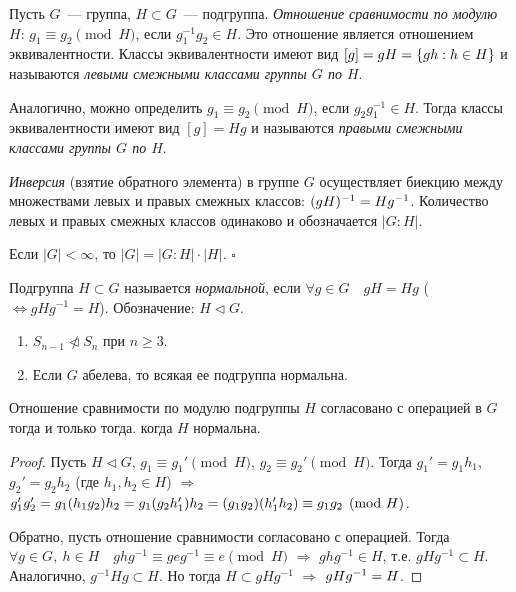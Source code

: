 \documentclass[a4paper]{article}
\newcommand*{\p}[1]{#1\nobreak\discretionary{}{\hbox{$\mathsurround=0pt #1$}}{}}
\begin{document}
Пусть $G$~--- группа, $H\subset G$~--- подгруппа. \emph{Отношение
сравнимости по модулю $H$}: $g_1\equiv g_2\pmod{H}$, если
$g_1^{-1}g_2\in H$. Это отношение является отношением
эквивалентности. Классы эквивалентности имеют вид $[g]\p=gH=\{gh:
h\in H\}$ и называются \emph{левыми смежными классами группы $G$ по
$H$}.

Аналогично, можно определить $g_1\equiv g_2\pmod{H}$, если
$g_2g_1^{-1}\in H$. Тогда классы эквивалентности имеют вид $[g]=Hg$
и называются \emph{правыми смежными классами группы $G$ по $H$}.

\emph{Инверсия} (взятие обратного элемента) в группе $G$
осуществляет биекцию между множествами левых и правых смежных
классов: $(gH)^{-1}\p=Hg^{-1}$. Количество левых и правых смежных
классов одинаково и обозначается $|G:H|$.

\begin{theorem}[Лагранж]
Если $|G|<\infty$, то $|G|=|G:H|\cdot |H|$. $\square$
\end{theorem}

Подгруппа $H\subset G$ называется \emph{нормальной}, если $\forall
g\in G\quad gH=Hg$ ($\Leftrightarrow gHg^{-1}=H$). Обозначение:
$H\triangleleft G$.

\prim
\begin{enumerate}
  \item $S_{n-1}\ntriangleleft S_n$ при $n\geqslant 3$.
  \item Если $G$ абелева, то всякая ее подгруппа нормальна.
\end{enumerate}

\begin{theorem}
Отношение сравнимости по модулю подгруппы $H$ согласовано с
операцией в $G$ тогда и только тогда. когда $H$ нормальна.
\end{theorem}

\begin{proof}
Пусть $H\triangleleft G$, $g_1\equiv g_1'\pmod{H}$, $g_2\equiv
g_2'\pmod{H}$. Тогда $g_1'=g_1h_1$, $g_2'=g_2h_2$ (где $h_1,h_2\in
H$) $\Rightarrow$
$g_1'g_2'=g_1(h_1g_2)h_2=g_1(g_2h_1')h_2\p=(g_1g_2)(h_1'h_2)\equiv
g_1g_2\pmod{H}$.

Обратно, пусть отношение сравнимости согласовано с операцией. Тогда
$\forall g\in G,\: h\in H\quad ghg^{-1}\equiv geg^{-1}\equiv
e\pmod{H}$ $\Rightarrow$ $ghg^{-1}\in H$, т.е. $gHg^{-1}\subset H$.
Аналогично, $g^{-1}Hg\subset H$. Но тогда $H\subset gHg^{-1}$
$\Rightarrow$ $gHg^{-1}\p=H$.
\end{proof}
\end{document}
